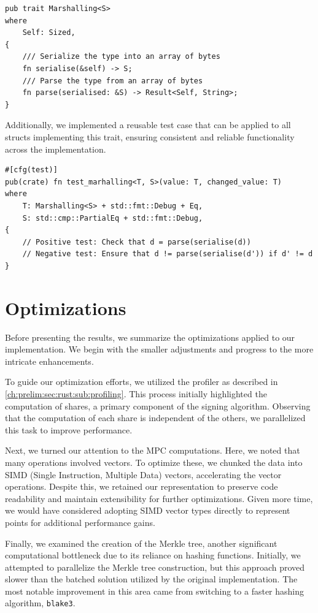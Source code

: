 \documentclass[11pt]{report}
\theoremstyle{definition}
\theoremstyle{plain}
\begin{document}
\begin{verbatim}
pub trait Marshalling<S>
where
    Self: Sized,
{
    /// Serialize the type into an array of bytes
    fn serialise(&self) -> S;
    /// Parse the type from an array of bytes
    fn parse(serialised: &S) -> Result<Self, String>;
}
\end{verbatim}

Additionally, we implemented a reusable test case that can be applied to all structs implementing this trait, ensuring consistent and reliable functionality across the implementation.

\begin{verbatim}
#[cfg(test)]
pub(crate) fn test_marhalling<T, S>(value: T, changed_value: T)
where
    T: Marshalling<S> + std::fmt::Debug + Eq,
    S: std::cmp::PartialEq + std::fmt::Debug,
{
    // Positive test: Check that d = parse(serialise(d))
    // Negative test: Ensure that d != parse(serialise(d')) if d' != d
}
\end{verbatim}

\section{Optimizations}
Before presenting the results, we summarize the optimizations applied to our implementation. We begin with the smaller adjustments and progress to the more intricate enhancements.

To guide our optimization efforts, we utilized the profiler as described in \autoref{ch:prelim:sec:rust:sub:profiling}. This process initially highlighted the computation of shares, a primary component of the signing algorithm. Observing that the computation of each share is independent of the others, we parallelized this task to improve performance.

Next, we turned our attention to the MPC computations. Here, we noted that many operations involved vectors. To optimize these, we chunked the data into SIMD (Single Instruction, Multiple Data) vectors, accelerating the vector operations. Despite this, we retained our  representation to preserve code readability and maintain extensibility for further optimizations. Given more time, we would have considered adopting SIMD vector types directly to represent points for additional performance gains.

Finally, we examined the creation of the Merkle tree, another significant computational bottleneck due to its reliance on hashing functions. Initially, we attempted to parallelize the Merkle tree construction, but this approach proved slower than the batched solution utilized by the original implementation. The most notable improvement in this area came from switching to a faster hashing algorithm, \texttt{blake3}.
\end{document}
